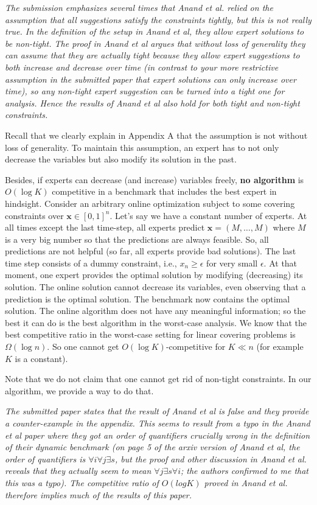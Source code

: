\documentclass[12pt]{article}
\begin{document}
\textit{\color{red} 
The submission emphasizes several times that Anand et al. relied on the assumption that all suggestions satisfy the constraints tightly, but this is not really true. In the definition of the setup in Anand et al, they allow expert solutions to be non-tight. The proof in Anand et al argues that without loss of generality they can assume that they are actually tight because they allow expert suggestions to both increase and decrease over time (in contrast to your more restrictive assumption in the submitted paper that expert solutions can only increase over time), so any non-tight expert suggestion can be turned into a tight one for analysis. Hence the results of Anand et al also hold for both tight and non-tight constraints.}

Recall that we clearly explain in Appendix A that the assumption is not without loss of generality. To maintain this assumption, an expert has to not only decrease the variables but also modify its solution in the past. 

Besides, if experts can decrease (and increase) variables freely, \textbf{no algorithm} is $O(\log K)$ competitive in a benchmark that includes the best expert in hindsight. 
Consider an arbitrary online optimization subject to some covering constraints over $\textbf{x} \in [0,1]^{n}$. Let's say we have a constant number of experts. At all times except the last time-step, all experts predict 
$\textbf{x} = (M, \ldots, M)$ where $M$ is a very big number so that the predictions are always feasible. So, all predictions are not helpful (so far, all experts provide bad solutions). The last time step consists of a dummy constraint, i.e., $x_{n} \geq \epsilon$ for very small $\epsilon$. At that moment, one expert provides the optimal solution by modifying (decreasing) its solution. The online solution cannot decrease its variables, even observing that a prediction is the optimal solution. The benchmark now contains the optimal solution. The online algorithm does not have any meaningful information; so the best it can do is the best algorithm in the worst-case analysis. We know that the best competitive ratio in the worst-case setting for linear covering problems is $\Omega(\log n)$. So one cannot get $O(\log K)$-competitive for $K \ll n$ (for example $K$ is a constant).    

Note that we do not claim that one cannot get rid of non-tight constraints. In our algorithm, we provide a way to do that.


\textit{\color{red} 
The submitted paper states that the result of Anand et al is false and they provide a counter-example in the appendix. This seems to result from a typo in the Anand et al paper where they got an order of quantifiers crucially wrong in the definition of their dynamic benchmark (on page 5 of the arxiv version of Anand et al, the order of quantifiers is $\forall i \forall j \exists s$, but the proof and other discussion in Anand et al. reveals that they actually seem to mean $\forall j \exists s \forall i$; the authors confirmed to me that this was a typo). The competitive ratio of $O(log K)$ proved in Anand et al. therefore implies much of the results of this paper.
}
\end{document}

